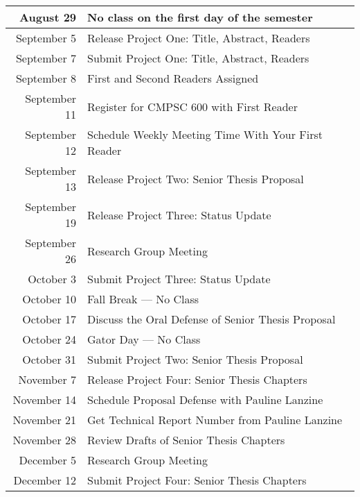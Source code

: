 \documentclass[11pt]{article}
\begin{document}
\begin{center}
\begin{longtable}{r|l}

\hline

August 29 & No class on the first day of the semester \\

\hline

September 5  & Release Project One: Title, Abstract, Readers       \\
September 7  & Submit Project One: Title, Abstract, Readers        \\
September 8  & First and Second Readers Assigned                   \\
September 11 & Register for CMPSC 600 with First Reader            \\
September 12 & Schedule Weekly Meeting Time With Your First Reader \\
September 13 & Release Project Two: Senior Thesis Proposal         \\
September 19 & Release Project Three: Status Update \\
September 26 & Research Group Meeting \\

\hline

October 3  & Submit Project Three: Status Update                \\
October 10 & Fall Break --- No Class                            \\
October 17 & Discuss the Oral Defense of Senior Thesis Proposal \\
October 24 & Gator Day --- No Class                             \\
October 31 & Submit Project Two: Senior Thesis Proposal         \\

\hline

November 7  & Release Project Four: Senior Thesis Chapters     \\
November 14 & Schedule Proposal Defense with Pauline Lanzine   \\
November 21 & Get Technical Report Number from Pauline Lanzine \\
November 28 & Review Drafts of Senior Thesis Chapters          \\

\hline

December 5  & Research Group Meeting                      \\
December 12 & Submit Project Four: Senior Thesis Chapters \\


\end{longtable}
\end{center}
\end{document}
